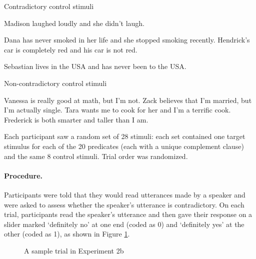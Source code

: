 \documentclass[11pt,fleqn]{article}
\newcommand{\6}{\mbox{$[\hspace*{-.6mm}[$}}
\newcommand{\9}{\mbox{$]\hspace*{-.6mm}]$}}
\begin{document}
{\begin{exe}

\ex\label{control-bad} Contradictory control stimuli
\begin{xlist}
\ex Madison laughed loudly and she didn't laugh.

\ex Dana has never smoked in her life and she stopped smoking recently.
\ex Hendrick's car is completely red and his car is not red.

\ex Sebastian lives in the USA and has never been to the USA.
\end{xlist}

\ex\label{control-good} Non-contradictory control stimuli
\begin{xlist}
\ex Vanessa is really good at math, but I'm not.
\ex Zack believes that I'm married, but I'm actually single.
\ex Tara wants me to cook for her and I'm a terrific cook.
\ex Frederick is both smarter and taller than I am.

\end{xlist}

\end{exe}

Each participant saw a random set of 28 stimuli: each set contained one target stimulus for each of the 20 predicates (each with a unique complement clause) and the same 8 control stimuli. Trial order was randomized.


\paragraph{Procedure.} Participants were told that they would read utterances made by a speaker and were asked to assess whether the speaker's utterance is contradictory. On each trial, participants read the speaker's utterance and then gave their response on a slider marked `definitely no' at one end (coded as 0) and `definitely yes' at the other (coded as 1), as shown in Figure \ref{f-trial-exp2}.

\begin{figure}[h!]
\begin{center}
\end{center}
\caption{A sample trial in Experiment 2b}\label{f-trial-exp2}
\end{figure}

}
\end{document}
